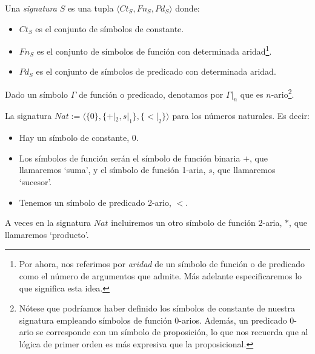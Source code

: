 \begin{definition}\label{sig}
Una \textit{signatura} $S$ es una tupla $\langle Ct_{S}, Fn_{S}, Pd_{S}\rangle$ donde:
\begin{itemize}
    \item $Ct_{S}$ es el conjunto de símbolos de constante.
    \item $Fn_{S}$ es el conjunto de símbolos de función con determinada aridad\footnote{Por ahora, nos referimos por \textit{aridad} de un símbolo de función o de predicado como el número de argumentos que admite. Más adelante especificaremos lo que significa esta idea.}.
    \item $Pd_{S}$ es el conjunto de símbolos de predicado con determinada aridad.
\end{itemize} 
Dado un símbolo $\Gamma$ de función o predicado, denotamos por $\Gamma|_{n}$ que es $n$-ario\footnote{Nótese que podríamos haber definido los símbolos de constante de nuestra signatura empleando símbolos de función 0-arios. Además, un predicado 0-ario se corresponde con un símbolo de proposición, lo que nos recuerda que al lógica de primer orden es más expresiva que la proposicional.}.
\end{definition}


\begin{example}
La signatura $Nat := \langle \{0\}, \{+|_2, s|_1\}, \{<|_2\}\rangle$ para los números naturales. Es decir:
\begin{itemize}
    \item Hay un símbolo de constante, $0$.
    \item Los símbolos de función serán el símbolo de función binaria $+$, que llamaremos `suma', y el símbolo de función 1-aria, $s$, que llamaremos `sucesor'.
    \item Tenemos un símbolo de predicado 2-ario, $<$.
\end{itemize}
A veces en la signatura $Nat$ incluiremos un otro símbolo de función 2-aria, $*$, que llamaremos `producto'.
\end{example}

